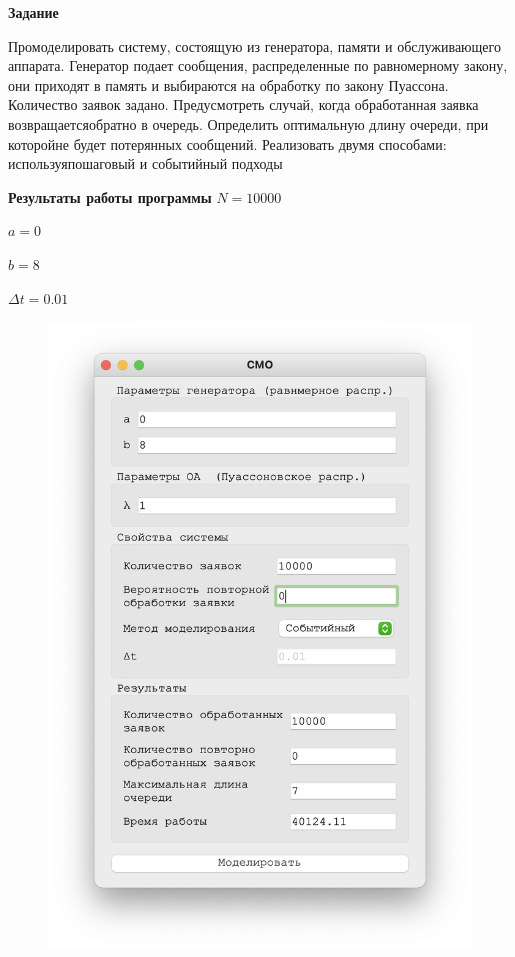 \textbf{Задание}

Промоделировать систему, состоящую из генератора, памяти и обслуживающего аппарата. Генератор подает сообщения, распределенные по равномерному закону, они приходят в память и выбираются на обработку по закону Пуассона. Количество заявок задано. 
Предусмотреть случай, когда обработанная заявка возвращаетсяобратно в очередь. Определить оптимальную длину очереди, при которойне будет потерянных сообщений. Реализовать двумя способами: используяпошаговый и событийный подходы

\textbf{Результаты работы программы}
$N = 10000$

$a = 0$

$b = 8$

$\Delta t = 0.01$

\begin{figure}[!htb]
    \begin{minipage}{0.55\textwidth}
      \centering
      \includegraphics[width=1\linewidth]{1-0-s}

\end{minipage}
\end{figure}
